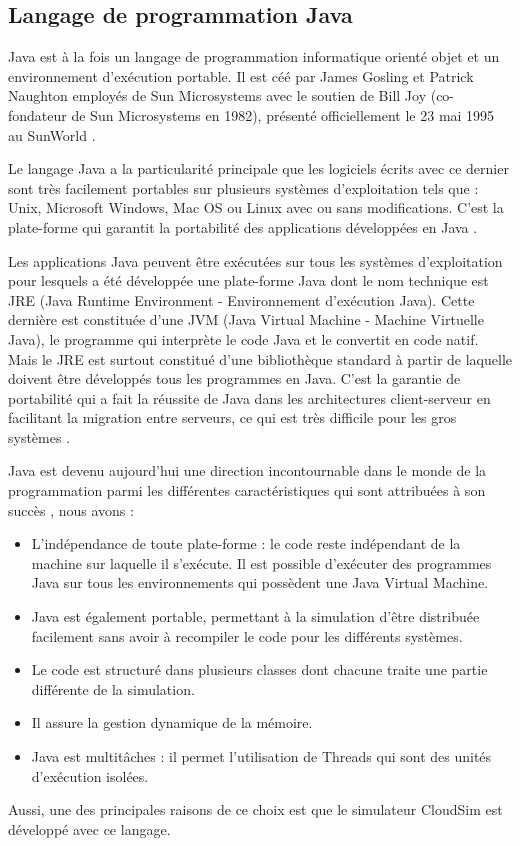 \subsection{Langage de programmation Java}
\begin{onehalfspace}
Java est à la fois un langage de programmation informatique orienté objet et un environnement
d’exécution portable. Il est céé par James Gosling et Patrick Naughton employés
de Sun Microsystems avec le soutien de Bill Joy (co-fondateur de Sun Microsystems en
1982), présenté officiellement le 23 mai 1995 au SunWorld \cite{ref39}.\medskip

Le langage Java a la particularité principale que les logiciels écrits avec ce dernier sont
très facilement portables sur plusieurs systèmes d’exploitation tels que : Unix, Microsoft
Windows, Mac OS ou Linux avec ou sans modifications. C’est la plate-forme qui
garantit la portabilité des applications développées en Java \cite{ref39}.\medskip

Les applications Java peuvent être exécutées sur tous les systèmes d’exploitation pour
lesquels a été développée une plate-forme Java dont le nom technique est JRE (Java Runtime
Environment - Environnement d’exécution Java). Cette dernière est constituée d’une
JVM (Java Virtual Machine - Machine Virtuelle Java), le programme qui interprète le code
Java et le convertit en code natif. Mais le JRE est surtout constitué d’une bibliothèque
standard à partir de laquelle doivent être développés tous les programmes en Java. C’est
la garantie de portabilité qui a fait la réussite de Java dans les architectures client-serveur
en facilitant la migration entre serveurs, ce qui est très difficile pour les gros systèmes \cite{ref40}.\medskip

Java est devenu aujourd’hui une direction incontournable dans le monde de la programmation
parmi les différentes caractéristiques qui sont attribuées à son succès , nous avons \cite{ref39} :\medskip

\begin{itemize}
\item L’indépendance de toute plate-forme : le code reste indépendant de la machine sur
laquelle il s’exécute. Il est possible d’exécuter des programmes Java sur tous les
environnements qui possèdent une Java Virtual Machine.
\item Java est également portable, permettant à la simulation d’être distribuée facilement
sans avoir à recompiler le code pour les différents systèmes.
\item Le code est structuré dans plusieurs classes dont chacune traite une partie différente
de la simulation.
\item Il assure la gestion dynamique de la mémoire.
\item Java est multitâches : il permet l’utilisation de Threads qui sont des unités d’exécution
isolées.

\end{itemize}

Aussi, une des principales raisons de ce choix est que le simulateur CloudSim est développé
avec ce langage.

\end{onehalfspace}

